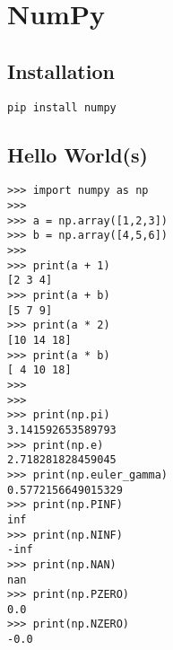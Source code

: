 \section{NumPy}

\subsection{Installation}

\begin{verbatim}
pip install numpy
\end{verbatim}

\subsection{Hello World(s)}

\begin{lstlisting}
>>> import numpy as np
>>>
>>> a = np.array([1,2,3])
>>> b = np.array([4,5,6])
>>>
>>> print(a + 1)
[2 3 4]
>>> print(a + b)
[5 7 9]
>>> print(a * 2)
[10 14 18]
>>> print(a * b)
[ 4 10 18]
>>>
>>>
>>> print(np.pi)
3.141592653589793
>>> print(np.e)
2.718281828459045
>>> print(np.euler_gamma)
0.5772156649015329
>>> print(np.PINF)
inf
>>> print(np.NINF)
-inf
>>> print(np.NAN)
nan
>>> print(np.PZERO)
0.0
>>> print(np.NZERO)
-0.0
\end{lstlisting}
